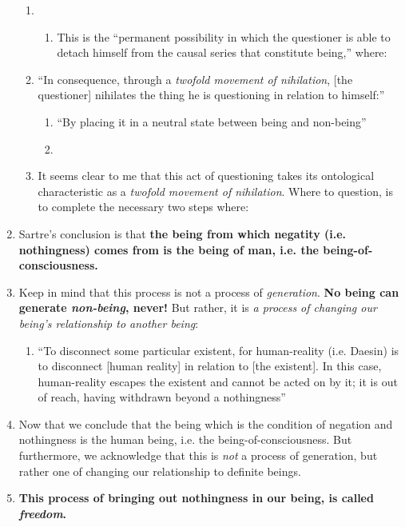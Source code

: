 \begin{enumerate}
\begin{enumerate}
    \item {}
    \begin{enumerate}
      \item This is the \enquote{permanent possibility in which the questioner is able to detach himself from the causal series that constitute being,} where:
    \end{enumerate}
    \item \enquote{In consequence, through a \emph{twofold movement of nihilation}, [the questioner] nihilates the thing he is questioning in relation to himself:}
    \begin{enumerate}
      \item \enquote{By placing it in a neutral state between being and non-being}
      \item {}
    \end{enumerate}
    \item It seems clear to me that this act of questioning takes its ontological characteristic as a \emph{twofold movement of nihilation}. Where to question, is to complete the necessary two steps where:
  \end{enumerate}
  \item Sartre's conclusion is that \textbf{the being from which negatity (i.e. nothingness) comes from is the being of man, i.e. the being-of-consciousness.}
  \item Keep in mind that this process is not a process of \emph{generation}. \textbf{No being can generate \emph{non-being}, never!} But rather, it is \emph{a process of changing our being's relationship to another being}:
  \begin{enumerate}
    \item \enquote{To disconnect some particular existent, for human-reality (i.e. Daesin) is to disconnect [human reality] in relation to [the existent]. In this case, human-reality escapes the existent and cannot be acted on by it; it is out of reach, having withdrawn beyond a nothingness}
  \end{enumerate}
  \item Now that we conclude that the being which is the condition of negation and nothingness is the human being, i.e. the being-of-consciousness. But furthermore, we acknowledge that this is \emph{not} a process of generation, but rather one of changing our relationship to definite beings.
  \item \textbf{This process of bringing out nothingness in our being, is called \emph{freedom}.}
\end{enumerate}


